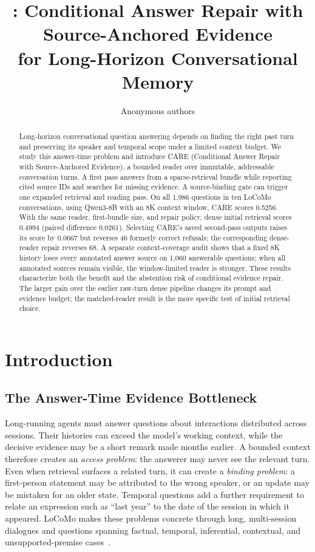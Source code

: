 \documentclass[11pt]{article}
\title{\care: Conditional Answer Repair with Source-Anchored Evidence\\
for Long-Horizon Conversational Memory}
\author{Anonymous authors}
\date{}
\newcommand{\care}{\textsc{CARE}}
\begin{document}
\maketitle

\begin{abstract}
Long-horizon conversational question answering depends on finding the right
past turn and preserving its speaker and temporal scope under a limited
context budget. We study this answer-time problem and introduce \care{}
(Conditional Answer Repair with Source-Anchored Evidence), a bounded reader
over immutable, addressable conversation turns. A first pass answers from a
sparse-retrieval bundle while reporting cited source IDs and searches for
missing evidence. A source-binding gate can trigger one expanded retrieval
and reading pass. On all 1,986 questions in ten LoCoMo conversations, using
Qwen3-8B with an 8K context window, \care{} scores 0.5256. With the same
reader, first-bundle size, and repair policy, dense initial retrieval scores
0.4994 (paired difference 0.0261). Selecting \care{}'s saved second-pass
outputs raises its score by 0.0667 but reverses 46 formerly correct
refusals; the corresponding dense-reader repair reverses 68. A separate
context-coverage audit shows that a fixed 8K history
loses every annotated answer source on 1,060 answerable questions; when all
annotated sources remain visible, the window-limited reader is stronger.
These results characterize both the benefit and the abstention risk of
conditional evidence repair. The larger gain over the earlier raw-turn dense
pipeline changes its prompt and evidence budget; the matched-reader result
is the more specific test of initial retrieval choice.
\end{abstract}

\section{Introduction}
\label{sec:introduction}

\subsection{The Answer-Time Evidence Bottleneck}

Long-running agents must answer questions about interactions distributed
across sessions. Their histories can exceed the model's working context,
while the decisive evidence may be a short remark made months earlier.
A bounded context therefore creates an \emph{access problem}: the answerer
may never see the relevant turn. Even when retrieval surfaces a related
turn, it can create a \emph{binding problem}: a first-person statement may
be attributed to the wrong speaker, or an update may be mistaken for an
older state. Temporal questions add a further requirement to relate an
expression such as ``last year'' to the date of the session in which it
appeared. LoCoMo makes these problems concrete through long, multi-session
dialogues and questions spanning factual, temporal, inferential, contextual,
and unsupported-premise cases~\cite{maharana2024locomo}.
\end{document}
